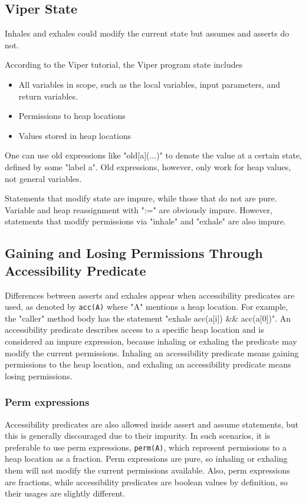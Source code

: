 \documentclass[msc,oneside]{ubcthesis}
\begin{document}
\subsection{Viper State}
Inhales and exhales could modify the current state but assumes and asserts do not.

According to the Viper tutorial, the Viper program state includes 
\begin{itemize}
    \item All variables in scope, such as the local variables, input parameters, and return variables.  
    \item Permissions to heap locations
    \item Values stored in heap locations
\end{itemize}

One can use old expressions like "old[a](...)" to denote the value at a certain state, defined by some "label a". Old expressions, however, only work for heap values, not general variables.

Statements that modify state are impure, while those that do not are pure. Variable and heap reassignment with ":=" are obviously impure. However, statements that modify permissions via "inhale" and "exhale" are also impure.

\subsection{Gaining and Losing Permissions Through Accessibility Predicate}
Differences between asserts and exhales appear when accessibility predicates are used, as denoted by \lstinline{acc(A)} where "A" mentions a heap location. For example, the "caller" method body has the statement "exhale acc(a[i]) && acc(a[0])". An accessibility predicate describes access to a specific heap location and is considered an impure expression, because inhaling or exhaling the predicate may modify the current permissions. Inhaling an accessibility predicate means gaining permissions to the heap location, and exhaling an accessibility predicate means losing permissions. 

\subsubsection{Perm expressions}
Accessibility predicates are also allowed inside assert and assume statements, but this is generally discouraged due to their impurity. In such scenarios, it is preferable to use perm expressions, \lstinline{perm(A)}, which represent permissions to a heap location as a fraction. Perm expressions are pure, so inhaling or exhaling them will not modify the current permissions available. Also, perm expressions are fractions, while accessibility predicates are boolean values by definition, so their usages are slightly different.
\end{document}
